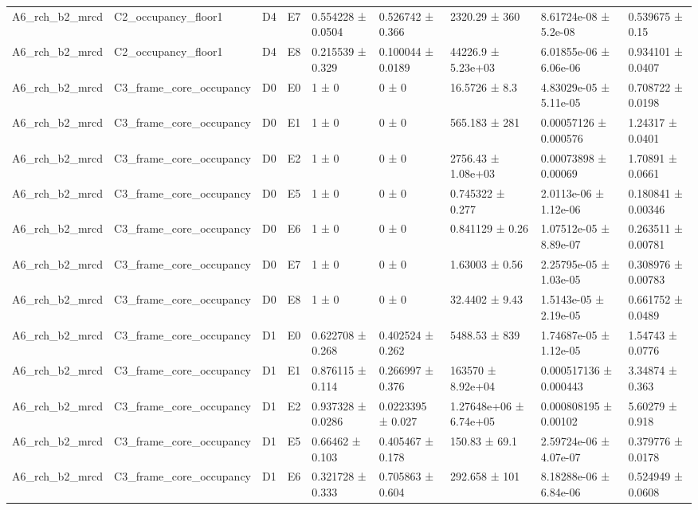 \begin{table}
\begin{tabular}{lllllllll}
A6\_rch\_b2\_mrcd & C2\_occupancy\_floor1 & D4 & E7 & 0.554228 ± 0.0504 & 0.526742 ± 0.366 & 2320.29 ± 360 & 8.61724e-08 ± 5.2e-08 & 0.539675 ± 0.15 \\
A6\_rch\_b2\_mrcd & C2\_occupancy\_floor1 & D4 & E8 & 0.215539 ± 0.329 & 0.100044 ± 0.0189 & 44226.9 ± 5.23e+03 & 6.01855e-06 ± 6.06e-06 & 0.934101 ± 0.0407 \\
A6\_rch\_b2\_mrcd & C3\_frame\_core\_occupancy & D0 & E0 & 1 ± 0 & 0 ± 0 & 16.5726 ± 8.3 & 4.83029e-05 ± 5.11e-05 & 0.708722 ± 0.0198 \\
A6\_rch\_b2\_mrcd & C3\_frame\_core\_occupancy & D0 & E1 & 1 ± 0 & 0 ± 0 & 565.183 ± 281 & 0.00057126 ± 0.000576 & 1.24317 ± 0.0401 \\
A6\_rch\_b2\_mrcd & C3\_frame\_core\_occupancy & D0 & E2 & 1 ± 0 & 0 ± 0 & 2756.43 ± 1.08e+03 & 0.00073898 ± 0.00069 & 1.70891 ± 0.0661 \\
A6\_rch\_b2\_mrcd & C3\_frame\_core\_occupancy & D0 & E5 & 1 ± 0 & 0 ± 0 & 0.745322 ± 0.277 & 2.0113e-06 ± 1.12e-06 & 0.180841 ± 0.00346 \\
A6\_rch\_b2\_mrcd & C3\_frame\_core\_occupancy & D0 & E6 & 1 ± 0 & 0 ± 0 & 0.841129 ± 0.26 & 1.07512e-05 ± 8.89e-07 & 0.263511 ± 0.00781 \\
A6\_rch\_b2\_mrcd & C3\_frame\_core\_occupancy & D0 & E7 & 1 ± 0 & 0 ± 0 & 1.63003 ± 0.56 & 2.25795e-05 ± 1.03e-05 & 0.308976 ± 0.00783 \\
A6\_rch\_b2\_mrcd & C3\_frame\_core\_occupancy & D0 & E8 & 1 ± 0 & 0 ± 0 & 32.4402 ± 9.43 & 1.5143e-05 ± 2.19e-05 & 0.661752 ± 0.0489 \\
A6\_rch\_b2\_mrcd & C3\_frame\_core\_occupancy & D1 & E0 & 0.622708 ± 0.268 & 0.402524 ± 0.262 & 5488.53 ± 839 & 1.74687e-05 ± 1.12e-05 & 1.54743 ± 0.0776 \\
A6\_rch\_b2\_mrcd & C3\_frame\_core\_occupancy & D1 & E1 & 0.876115 ± 0.114 & 0.266997 ± 0.376 & 163570 ± 8.92e+04 & 0.000517136 ± 0.000443 & 3.34874 ± 0.363 \\
A6\_rch\_b2\_mrcd & C3\_frame\_core\_occupancy & D1 & E2 & 0.937328 ± 0.0286 & 0.0223395 ± 0.027 & 1.27648e+06 ± 6.74e+05 & 0.000808195 ± 0.00102 & 5.60279 ± 0.918 \\
A6\_rch\_b2\_mrcd & C3\_frame\_core\_occupancy & D1 & E5 & 0.66462 ± 0.103 & 0.405467 ± 0.178 & 150.83 ± 69.1 & 2.59724e-06 ± 4.07e-07 & 0.379776 ± 0.0178 \\
A6\_rch\_b2\_mrcd & C3\_frame\_core\_occupancy & D1 & E6 & 0.321728 ± 0.333 & 0.705863 ± 0.604 & 292.658 ± 101 & 8.18288e-06 ± 6.84e-06 & 0.524949 ± 0.0608 \\

\end{tabular}
\end{table}
